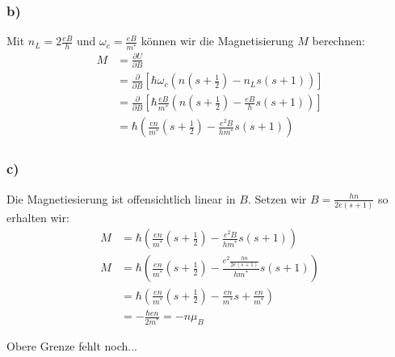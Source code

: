 \subsubsection*{b)}
Mit $n_L = 2\frac{eB}{h}$ und $\omega_c = \frac{eB}{m^*}$ können wir die Magnetisierung $M$ berechnen:
\begin{align*}
M &= \frac{\partial U}{\partial B}\\
 &= \frac{\partial}{\partial B} \left[\hbar\omega_c\left(n\left(s+\frac 12\right)-n_L s(s+1)\right)\right] \\
 &= \frac{\partial}{\partial B} \left[\hbar\frac{eB}{m^*}\left(n\left(s+\frac 12\right)-\frac{eB}{h} s(s+1)\right)\right]\\
 &= \hbar\left(\frac{en}{m^*}\left(s+\frac 12\right)-\frac{e^2B}{hm^*} s(s+1)\right)
\end{align*}

\subsubsection*{c)}
Die Magnetiesierung ist offensichtlich linear in $B$. Setzen wir $B = \frac{hn}{2e(s+1)}$ so erhalten wir:
\begin{align*}
M &= \hbar\left(\frac{en}{m^*}\left(s+\frac 12\right)-\frac{e^2B}{hm^*} s(s+1)\right)\\
M &= \hbar\left(\frac{en}{m^*}\left(s+\frac 12\right)-\frac{e^2\frac{hn}{2e(s+1)}}{hm^*} s(s+1)\right) \\
&= \hbar\left(\frac{en}{m^*}\left(s+\frac 12\right) - \frac{en}{m^*}s+\frac{en}{m^*}\right)\\
&= -\frac{\hbar en}{2m^*} = -n \mu_B
\end{align*}

Obere Grenze fehlt noch...
